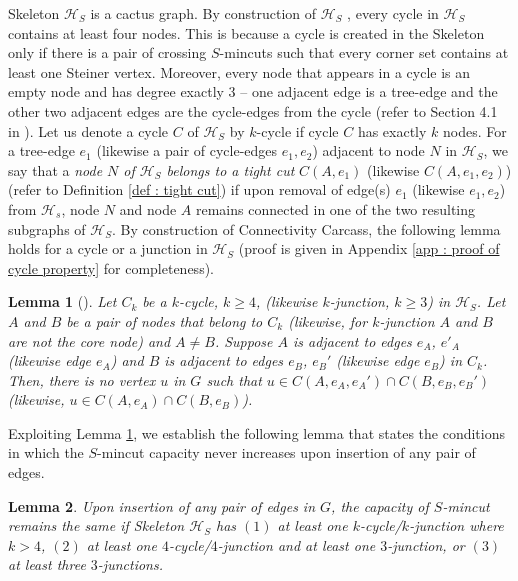 \documentclass[letterpaper,11pt]{article}
\newtheorem{lemma}{Lemma}[]
\begin{document}
Skeleton ${\mathcal H}_S$ is a cactus graph.  By construction of ${\mathcal H}_S$ \cite{DBLP:conf/stoc/DinitzV94, DBLP:conf/soda/DinitzV95, DBLP:journals/siamcomp/DinitzV00}, every cycle in ${\mathcal H}_S$ contains at least four nodes. This is because a cycle is created in the Skeleton only if there is a pair of crossing $S$-mincuts such that every corner set contains at least one Steiner vertex. Moreover, every node that appears in a cycle is an empty node and has degree exactly $3$ -- one adjacent edge is a tree-edge and the other two adjacent edges are the cycle-edges from the cycle (refer to Section 4.1 in \cite{DBLP:conf/soda/DinitzV95}). 
Let us denote a cycle $C$ of ${\mathcal H}_S$ by $k$-cycle if cycle $C$ has exactly $k$ nodes.
For a tree-edge $e_1$ (likewise a pair of cycle-edges $e_1,e_2$) adjacent to node $N$ in ${\mathcal H}_S$, we say that a \textit{node $N$ of ${\mathcal H}_S$ belongs to a tight cut} $C(A,e_1)$ (likewise $C(A,e_1,e_2)$) (refer to Definition \ref{def : tight cut}) if upon removal of edge(s) $e_1$ (likewise $e_1,e_2$) from ${\mathcal H}_s$, node $N$ and node $A$ remains connected in one of the two resulting subgraphs of ${\mathcal H}_S$. 
By construction of Connectivity Carcass, the following lemma holds for a cycle or a junction in ${\mathcal H}_S$ (proof is given in Appendix \ref{app : proof of cycle property} for completeness). 
\begin{lemma} [\cite{DBLP:conf/stoc/DinitzV94, DBLP:conf/soda/DinitzV95, DBLP:journals/siamcomp/DinitzV00}] \label{lem : cycle property}
Let $C_k$ be a $k$-cycle, $k\ge 4$, (likewise $k$-junction, $k\ge 3$) in ${\mathcal H}_S$. Let $A$ and $B$ be a pair of nodes that belong to $C_k$ (likewise, for $k$-junction $A$ and $B$ are not the core node) and $A\ne B$. Suppose $A$ is adjacent to edges $e_A$, $e'_A$ (likewise edge $e_A$) and  $B$ is adjacent to edges $e_B$, $e_B'$ (likewise edge $e_B$) in $C_k$. Then, there is no vertex $u$ in $G$ such that $u\in C(A,e_A,e_A')\cap C(B,e_B,e_B')$ (likewise, $u\in C(A,e_A)\cap C(B,e_B)$).
\end{lemma}
Exploiting Lemma \ref{lem : cycle property}, we establish the following lemma that states the conditions in which the $S$-mincut capacity never increases upon insertion of any pair of edges.
\begin{lemma} \label{lem : condition of insertion}
    Upon insertion of any pair of edges in $G$, the capacity of $S$-mincut remains the same if Skeleton ${\mathcal H}_S$ has $(1)$ at least one $k$-cycle/$k$-junction where $k>4$, $(2)$ at least one $4$-cycle/$4$-junction and at least one $3$-junction, or $(3)$ at least three $3$-junctions.
\end{lemma}
\end{document}
